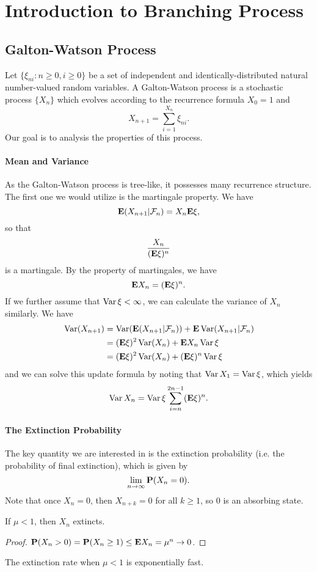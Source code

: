 \section{Introduction to Branching Process}
\subsection{Galton-Watson Process}
Let $\{\xi_{ni}:n\geq 0,i\geq 0\}$ be a set of independent and identically-distributed natural number-valued random variables.
A Galton-Watson process is a stochastic process $\{X_n\}$ which evolves according to the recurrence formula $X_0 = 1$ and 
\[ X_{n+1}=\sum_{i=1}^{X_n}\xi_{ni}.\]
Our goal is to analysis the properties of this process.

\paragraph{Mean and Variance} As the Galton-Watson process is tree-like, it possesses many recurrence structure.
The first one we would utilize is the martingale property. We have 
\[\mathbf{E}(X_{n+1}|\mathcal{F}_n)=X_n\mathbf{E} \xi ,\]
so that \[\frac{X_n}{(\mathbf{E} \xi)^n}\]
is a martingale. By the property of martingales, we have 
\[\mathbf{E} X_{n}=(\mathbf{E} \xi)^n.\]
If we further assume that $\operatorname*{Var} \xi<\infty$, we can calculate the variance of $X_n$ similarly. 
We have
\begin{align*}
    \operatorname*{Var} (X_{n+1}) &= \operatorname*{Var} (\mathbf{E}(X_{n+1}|\mathcal{F}_n))+\mathbf{E} \operatorname*{Var}(X_{n+1}|\mathcal{F}_n)\\
    &=(\mathbf{E} \xi)^2\operatorname*{Var}(X_n)+\mathbf{E} X_n \operatorname*{Var} \xi\\
    &=(\mathbf{E} \xi)^2\operatorname*{Var}(X_n)+(\mathbf{E} \xi)^n \operatorname*{Var} \xi
\end{align*}
and we can solve this update formula by noting that $\operatorname*{Var} X_{1}=\operatorname*{Var} \xi $, which yields
\[\operatorname*{Var} X_{n}=\operatorname*{Var} \xi \sum_{i=n}^{2n-1} (\mathbf{E} \xi)^n.\]

\paragraph{The Extinction Probability} The key quantity we are interested in is the
extinction probability (i.e. the probability of final extinction), which is given by
\[ \lim_{n\to\infty}\mathbf{P}(X_n=0).\]
Note that once $X_n=0$, then $X_{n+k}=0$ for all $k\geq 1$, so $0$ is an absorbing state.

\begin{theorem}[subcritical]
    If $\mu<1$, then $X_n$ extincts.
\end{theorem}
\begin{proof}
    $\mathbf{P}(X_n>0)=\mathbf{P}(X_n\geq 1)\leq \mathbf{E} X_n = \mu^n\to 0$.
\end{proof}
\begin{remark}
    The extinction rate when $\mu<1$ is exponentially fast.
\end{remark}

